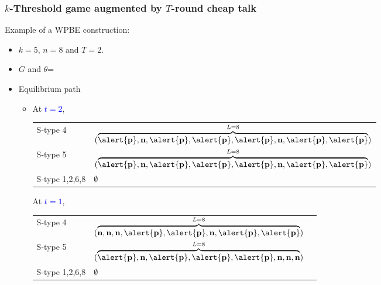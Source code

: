 \documentclass[10pt]{beamer}
\begin{document}
\begin{frame}
  \frametitle{$k$-Threshold game augmented by $T$-round cheap talk}
Example of a WPBE construction:
\begin{itemize}
\item $k=5$, $n=8$ and $T=2$.
\item $G$ and $\theta$=
\begin{center}
\end{center}
\end{itemize}

\begin{itemize}
\item Equilibrium path
\begin{itemize}
\item 
{}
{
At \textcolor{blue}{$t=2$}, 
\begin{table}[h]
\begin{tabular}{ll }
S-type 4 & $(\overbrace{\alert{\textbf{p}},\textbf{n},\alert{\textbf{p}},\alert{\textbf{p}},\alert{\textbf{p}},\textbf{n},\alert{\textbf{p}},\alert{\textbf{p}}}^{L=8})$\\
S-type 5 & $(\overbrace{\alert{\textbf{p}},\textbf{n},\alert{\textbf{p}},\alert{\textbf{p}},\alert{\textbf{p}},\textbf{n},\alert{\textbf{p}},\alert{\textbf{p}}}^{L=8})$\\
S-type 1,2,6,8 & $\emptyset$
\end{tabular}
\end{table}
}
{
At \textcolor{blue}{$t=1$}, 
\begin{table}[h]
\begin{tabular}{ll l}
S-type 4 & $(\overbrace{\textbf{n},\textbf{n},\textbf{n},\alert{\textbf{p}},\alert{\textbf{p}},\textbf{n},\alert{\textbf{p}},\alert{\textbf{p}}}^{L=8})$\\
S-type 5 & $(\overbrace{\alert{\textbf{p}},\textbf{n},\alert{\textbf{p}},\alert{\textbf{p}},\alert{\textbf{p}},\textbf{n},\textbf{n},\textbf{n}}^{L=8})$ \\
S-type 1,2,6,8 & $\emptyset$
\end{tabular}
\end{table}
}


\end{itemize}
\end{itemize}
\end{frame}
\end{document}
